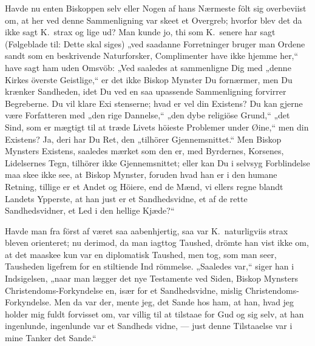 \documentclass[12pt,a4paper]{article}
\newcommand{\opage}[1]{\marginnote{\footnotesize\textit{[#1]}}}
\begin{document}
Havde nu enten Biskoppen selv eller Nogen af hans
Nærmeste fölt sig overbeviist om, at her ved denne
Sammenligning var skeet et Overgreb; hvorfor blev det
da ikke sagt K.\ strax og lige ud? Man kunde jo, thi
som K.\ senere har sagt (Følgeblade til: Dette skal siges)
„ved saadanne Forretninger bruger man Ordene sandt
som en beskrivende Naturforsker, Complimenter have
ikke hjemme her,“ have sagt ham uden Omsvöb: „Ved
saaledes at sammenligne Dig med „denne Kirkes överste
Geistlige,“ er det ikke Biskop Mynster Du fornærmer,
men Du krænker Sandheden, idet Du ved en saa upassende
Sammenligning forvirrer Begreberne. Du vil klare Exi\-%
stenserne; hvad er vel din Existens? Du kan gjerne
være Forfatteren med „den rige Dannelse,“ „den dybe
religiöse Grund,“ „det Sind, som er mægtigt til at træde
Livets höieste Problemer under Øine,“ men din Existens?
Ja, deri har Du Ret, den „tilhörer Gjennemsnittet.“ Men
Biskop Mynsters Existens, saaledes mærket som den er,
med Byrdernes, Korsenes, Lidelsernes Tegn, tilhörer ikke
Gjennemsnittet; eller kan Du i selvsyg Forblindelse maa\-%
skee ikke see, at Biskop Mynster, foruden hvad han er i den
humane Retning, tillige er et Andet og Höiere, end de
Mænd, vi ellers regne blandt Landets Ypperste, at han
\opage{20} just er et Sandhedsvidne, et af de rette Sandhedsvidner,
et Led i den hellige Kjæde?“

Havde man fra först af været saa aabenhjertig, saa
var K.\ naturligviis strax bleven orienteret; nu derimod,
da man iagttog Taushed, drömte han vist ikke om, at
det maaskee kun var en diplomatisk Taushed, men tog,
som man seer, Tausheden ligefrem for en stiltiende Ind\-%
römmelse. „Saaledes var,“ siger han i Indsigelsen, „naar
man lægger det nye Testamente ved Siden, Biskop Mynsters
Christendoms-Forkyndelse en, især for et Sandhedsvidne,
mislig Christendoms-Forkyndelse. Men da var der, mente
jeg, det Sande hos ham, at han, hvad jeg holder mig
fuldt forvisset om, var villig til at tilstaae for Gud og
sig selv, at han ingenlunde, ingenlunde var et Sandheds\-%
vidne, --- just denne Tilstaaelse var i mine Tanker det
Sande.“
\end{document}
